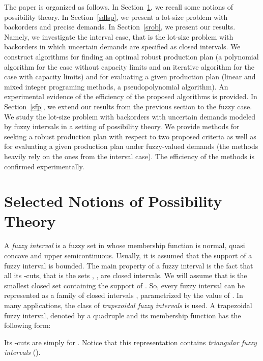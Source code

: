 \documentclass[11pt]{article}
\begin{document}
The paper is organized as follows. In
Section~\ref{ssnpt}, we recall some 
notions of possibility theory.  In
Section~\ref{sdlsp}, we present 
a lot-size problem with backorders and precise demands. 
In Section~\ref{srob}, we present our results. Namely, we
 investigate the interval case, that is the lot-size problem with backorders
in which uncertain demands are specified as closed intervals. We construct
 algorithms  for 
 finding an optimal robust production plan (a polynomial algorithm for the case without
 capacity limits and an iterative algorithm for the case with capacity limits)
 and for
 evaluating a given production plan (linear and mixed integer programing methods,
 a pseudopolynomial algorithm).
 An experimental evidence of the efficiency of the proposed algorithms is provided.
 In Section~\ref{sfp}, we extend our results from the previous section to the fuzzy case.
 We study the lot-size problem with backorders with uncertain
 demands modeled by fuzzy intervals in a setting of possibility theory.
 We provide methods for seeking a  robust production plan
 with respect to two proposed criteria as well as for evaluating a given production plan
under fuzzy-valued demands (the methods heavily rely on the ones from the interval case).
 The efficiency of the methods is confirmed experimentally. 

\section{Selected Notions of Possibility Theory}
\label{ssnpt}

A \emph{fuzzy interval}  is a fuzzy set in  whose membership function  is normal, quasi concave and upper semicontinuous. Usually, it is  assumed that the support of a fuzzy interval  is bounded. The main property of a fuzzy interval is the fact that all its -cuts, that is the sets , , are closed intervals. We will assume that  is the smallest closed set containing the support of . So, every fuzzy interval  can be represented as a family of closed intervals , parametrized by the value of . In many applications, the class of \emph{trapezoidal fuzzy intervals} is used.
 A trapezoidal fuzzy interval, denoted by a quadruple 
 and  its membership function has the following form:
 
Its  -cuts are simply
 for . Notice that this representation contains  \emph{triangular fuzzy intervals}  ().
 
\end{document}
